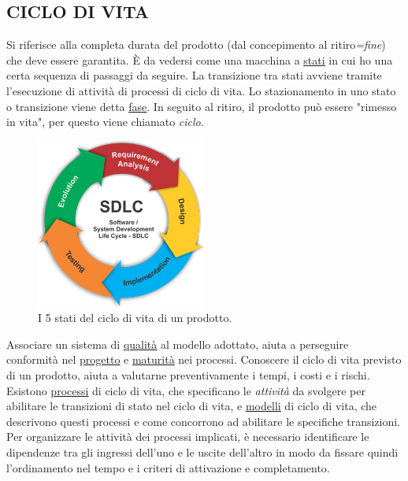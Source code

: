 		\subsection{CICLO DI VITA}  \label{ciclo}
		Si riferisce alla completa durata del prodotto (dal concepimento al ritiro\textit{=fine}) che deve essere garantita. È da vedersi come una macchina a \underline{\hyperref[stato]{stati}} in cui ho una certa sequenza di passaggi da seguire. La transizione tra stati avviene tramite l’esecuzione di
		attività di processi di ciclo di vita. Lo stazionamento in uno stato o transizione viene detta \underline{\hyperref[fase]{fase}}. In seguito al ritiro, il prodotto può essere "rimesso in vita", per questo viene chiamato \textit{ciclo}.
		
		\begin{figure}[H]
			\centering
			\includegraphics[width=0.5\textwidth]{img/lifecycle}		
			\caption{I 5 stati del ciclo di vita di un prodotto.}
		\end{figure} 
		
		Associare un sistema di \underline{\hyperref[qualita]{qualità}} al modello adottato, aiuta a perseguire conformità nel \underline{\hyperref[progetto]{progetto}} e \underline{\hyperref[maturita]{maturità}} nei processi.	Conoscere il ciclo di vita previsto di un prodotto, aiuta a valutarne preventivamente i tempi, i costi e i rischi. Esistono \underline{\hyperref[processo]{processi}} di ciclo di vita, che specificano le \textit{attività} da svolgere per abilitare le transizioni di stato nel ciclo di vita, e \underline{\hyperref[modelli]{modelli}} di ciclo di vita, che descrivono questi processi e come concorrono ad abilitare le specifiche transizioni. Per organizzare le attività dei processi implicati, è necessario identificare le dipendenze tra gli ingressi dell'uno e le uscite dell'altro in modo da fissare quindi l'ordinamento nel tempo e i criteri di attivazione e completamento.
	
